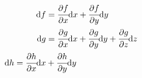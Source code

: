 \begin{align}
    \dd f &= \DP f x \dd x + \DP f y \dd y
    \nonumber
    \\
    \dd g &= \DP g x \dd x + \DP g y \dd y + \DP g z \dd z
    \label{eq:exact_align}
    \\
    \dd h = \DP h x \dd x &+ \DP h y \dd y
    \nonumber
\end{align}
